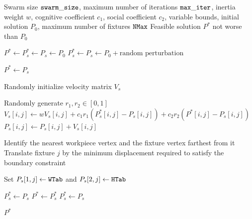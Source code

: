 \begin{algorithm}[htbp]
	\footnotesize
	\caption{Particle Swarm Optimization for Fixture Layout Optimization}
	\label{alg:pso_fixtures}
	\begin{algorithmic}[1]
		\Require Swarm size $\mathtt{swarm\_size}$, maximum number of iterations $\mathtt{max\_iter}$, inertia weight $w$, cognitive coefficient $c_1$,
		social coefficient $c_2$, variable bounds, initial solution $P_0$, maximum number of fixtures $\mathtt{NMax}$
		\Ensure Feasible solution $P^*$ not worse than $P_0$
		
		\label{alg:start_init}
		\State $P^* \gets P^*_s \gets P_s \gets P_0$
		\Else
		\State $P^*_s \gets P_s \gets P_0 + \text{random perturbation}$
		\EndIf
		\label{alg:end_init}
		
		\label{alg:start_init_eval}
		\State $P^*\gets P_s$
		\EndIf
		\EndIf
		\label{alg:end_init_eval}
		
		\State Randomly initialize velocity matrix $V_s$
		\EndFor
		
		\State Randomly generate $r_1,r_2\in[0,1]$
		\label{alg:start_pso_update}
		\State $V_s[i,j]\gets wV_s[i,j]+c_1r_1(P^*_s[i,j]-P_s[i,j])+c_2r_2(P^*[i,j]-P_s[i,j])$
		\State $P_s[i,j]\gets P_s[i,j]+V_s[i,j]$
		\label{alg:end_pso_update}
		\EndFor
		\EndFor
		
		\label{alg:start_fixing_geom}
		\State Identify the nearest workpiece vertex and the fixture vertex farthest from it
		\State Translate fixture $j$ by the minimum displacement required to satisfy the boundary constraint
		\label{alg:end_fixing_geom}
		\EndIf
		
		\label{alg:start_fixing_type}
		\State Set $P_s[1,j]\gets\mathtt{WTab}$ and $P_s[2,j]\gets\mathtt{HTab}$
		\EndIf
		\label{alg:end_fixing_type}
		\EndFor
		
		
		\label{alg:start_deb_eval}
		\State $P^*_s\gets P_s$
		\State $P^*\gets P^*_s$
		\EndIf
		\EndIf
		\State $P^*_s\gets P_s$
		\EndIf
		\label{alg:end_deb_eval}
		
		\EndFor
		\EndFor
		
		\State \Return $P^*$
		
	\end{algorithmic}
\end{algorithm}


